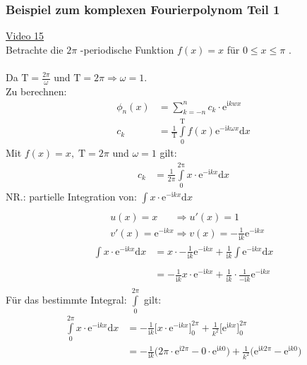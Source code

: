 \subsubsection{Beispiel zum komplexen Fourierpolynom Teil 1}
\href{https://youtu.be/PLrUWD6DO3g}{Video 15}\\
Betrachte die $ 2\pi $ -periodische Funktion $ f(x)=x $ für $ 0\leq x\leq\pi $ .\\
\\
Da $ \mathrm{T}=\frac{2\pi}{\omega} $ und $ \mathrm{T}=2\pi \Rightarrow \omega=1 $.\\
Zu berechnen:\\
\begin{align*}
\phi_n(x)&=\sum\limits_{k=-n}^{n}c_k\cdot \mathrm{e}^{\mathrm{i}kwx}\\
c_k&=\frac{1}{\mathrm{T}}\int\limits_{0}^{\mathrm{T}} f(x)\mathrm{e}^{-\mathrm{i}k\omega x}\mathrm{d}x
\end{align*}
Mit $f(x)=x,\; \mathrm{T}=2\pi $ und $ \omega=1 $ gilt:\\
\begin{align*}
c_k&=\frac{1}{2\pi}\int\limits_{0}^{\mathrm{2\pi}} x\cdot\mathrm{e}^{-\mathrm{i}k x}\mathrm{d}x
\end{align*}
NR.: partielle Integration von: $ \int\limits_{}^{} x\cdot \mathrm{e}^{-\mathrm{i}kx}\mathrm{d}x $\\
\begin{align*}
&u(x)=x\;\;\;\;\;\;\Rightarrow u'(x)=1\\
&v'(x)=\mathrm{e}^{-\mathrm{i}kx}\Rightarrow v(x)=-\frac{1}{\mathrm{i}k}\mathrm{e}^{-\mathrm{i}kx}
\end{align*}
\begin{align*}
\int\limits_{}^{}x\cdot \mathrm{e}^{-\mathrm{i}kx}\mathrm{d}x&=x\cdot-\frac{1}{\mathrm{i}k} \mathrm{e}^{-\mathrm{i}kx}+\frac{1}{\mathrm{i}k}\int\limits_{}^{}\mathrm{e}^{-\mathrm{i}kx} \mathrm{d}x\\
&=-\frac{1}{\mathrm{i}k}x\cdot \mathrm{e}^{-\mathrm{i}kx}+\frac{1}{\mathrm{i}k}\cdot\frac{1}{-\mathrm{i}k}\mathrm{e}^{-\mathrm{i}kx} \\
\end{align*}
Für das bestimmte Integral: $ \int\limits_{0}^{2\pi}  $ gilt:\\
\begin{align*}
\int\limits_{0}^{2\pi}x\cdot \mathrm{e}^{-\mathrm{i}kx}\mathrm{d}x&=-\frac{1}{\mathrm{i}k}\bigg[x\cdot \mathrm{e}^{-\mathrm{i}kx}\bigg]^{2\pi}_0+\frac{1}{k^2}\bigg[\mathrm{e}^{\mathrm{i}kx}\bigg]^{2\pi}_0\\
&=-\frac{1}{\mathrm{i}k}\big(2\pi\cdot\mathrm{e}^{\mathrm{i}2\pi}-0\cdot\mathrm{e}^{\mathrm{i}k0}\big)+\frac{1}{k^2}\big(\mathrm{e}^{\mathrm{i}k2\pi}-\mathrm{e}^{\mathrm{i}k0}\big)\\
\end{align*}
